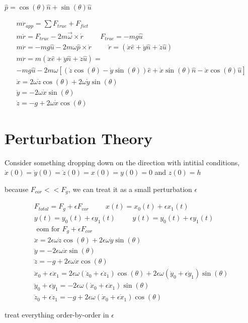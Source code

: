 \documentclass[fleqn]{report}
\newcommand{\hp}{\hspace{1cm}}
\newcommand{\equations} [1] {
\begin{gather*}
#1
\end{gather*}
}
\begin{document}
$\hat p = \cos(\theta) \hat n + \sin(\theta) \hat u$

\equations{
    m \ddot r_{app} = \sum F_{true} + F_{fict}
    \\
    m \ddot r = F_{true} - 2 m \vec \omega \times \dot r 
    \hp 
    F_{true} = -mg \hat u 
    \\
    m \ddot r = - mg \hat u - 2 m \omega \hat p \times \dot r 
    \hp 
    \dot r = (\dot x \hat e + \dot y \hat n + \dot z \hat u)
    \\
    m \ddot r =
    m (\ddot x \hat e + \ddot y \hat n + \ddot z \hat u) = 
    \\
    - mg \hat u - 2 m \omega \left[
        (\dot z \cos(\theta) - \dot y \sin(\theta)) \hat e + 
        \dot x \sin(\theta) \hat n - \dot x \cos(\theta) \hat u
    \right]
    \\
    \ddot x = 2 \omega \dot z \cos(\theta) + 2 \omega \dot y \sin(\theta) 
    \\
    \ddot y = -2 \omega \dot x \sin(\theta) 
    \\
    \ddot z = -g + 2 \omega \dot x \cos(\theta)
}

\section{Perturbation Theory}
Consider something dropping down on the direction with intitial conditions,
$\dot x(0) = \dot y(0) = \dot z(0) = x(0) = y(0) = 0$ and $z(0) = h$

because $F_{cor} << F_{g}$, we can treat it as a small perturbation $\epsilon$
\equations{
    F_{total} = F_{g} + \epsilon F_{cor}
    \hp
    x(t) = x_0(t) + \epsilon x_1(t)
    \\
    y(t) = y_0(t) + \epsilon y_1(t)
    \hp
    y(t) = y_0(t) + \epsilon y_1(t)
    \\
    \textrm{ eom for $F_g + \epsilon F_{cor}$ }
    \\
    \ddot x = 
    2 \epsilon \omega \dot z \cos(\theta) + 2 \epsilon \omega \dot y \sin(\theta) 
    \\
    \ddot y = 
    -2 \epsilon \omega \dot x \sin(\theta) 
    \\
    \ddot z = 
    -g + 2 \epsilon \omega \dot x \cos(\theta)
    \\
    \ddot x_0 + \epsilon \ddot x_1 = 
    2 \epsilon \omega (\dot z_0 + \epsilon \dot z_1) \cos(\theta) + 
    2 \epsilon \omega (\dot y_0 + \epsilon \dot y_1) \sin(\theta) 
    \\
    \ddot y_0 + \epsilon \ddot y_1 = 
    -2 \epsilon \omega (\dot x_0 + \epsilon \dot x_1) \sin(\theta) 
    \\
    \ddot z_0 + \epsilon \ddot z_1 = 
    -g + 2 \epsilon \omega (\dot x_0 + \epsilon \dot x_1) \cos(\theta)
}
treat everything order-by-order in $\epsilon$
\end{document}
